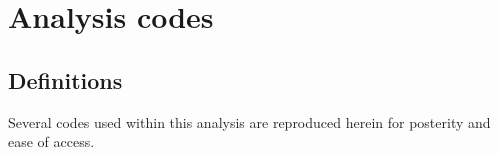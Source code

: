 %
%
%
%
%
%
%
%

%
%

\chapter{Analysis codes}
\label{appendix: codes}

\section{Definitions}

Several codes used within this analysis are reproduced herein for posterity and ease of access.



%
% 
% 
